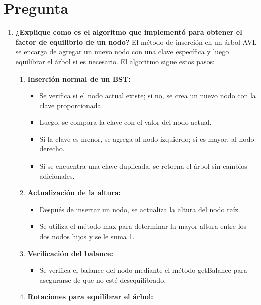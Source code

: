 \documentclass{article}
\begin{document}
	\section{Pregunta}
  \begin{enumerate}
    \item \textbf{¿Explique como es el algoritmo que implementó para obtener el factor de equilibrio de un nodo?}\newline
    El método de inserción en un árbol AVL se encarga de agregar un nuevo nodo con una clave específica y luego 
    equilibrar el árbol si es necesario. El algoritmo sigue estos pasos:
    \begin{enumerate}
      \item \textbf{Inserción normal de un BST:} \newline
        \begin{itemize}
          \item Se verifica si el nodo actual existe; si no, se crea un nuevo nodo con la clave proporcionada.
          \item Luego, se compara la clave con el valor del nodo actual.
          \item Si la clave es menor, se agrega al nodo izquierdo; si es mayor, al nodo derecho.
          \item Si se encuentra una clave duplicada, se retorna el árbol sin cambios adicionales.
        \end{itemize}
      \item \textbf{Actualización de la altura:} \newline
        \begin{itemize}
          \item Después de insertar un nodo, se actualiza la altura del nodo raíz.
          \item Se utiliza el método max para determinar la mayor altura entre los dos nodos hijos y se le suma 1.
        \end{itemize}
      \item \textbf{Verificación del balance:} \newline
        \begin{itemize}
          \item Se verifica el balance del nodo mediante el método getBalance para asegurarse de que no esté desequilibrado.
        \end{itemize}
      \item \textbf{Rotaciones para equilibrar el árbol:} \newline

\end{enumerate}
\end{enumerate}
\end{document}
